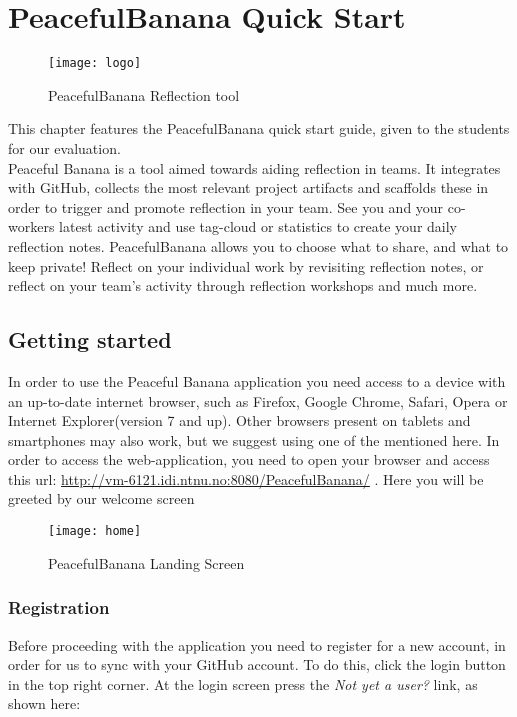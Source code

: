 \newpage
\thispagestyle{empty}
\mbox{}
\chapter{PeacefulBanana Quick Start}

\begin{figure}[h!]
\label{logo}
\centering
	\texttt{[image: logo]}
\caption{PeacefulBanana Reflection tool}
\end{figure}

This chapter features the PeacefulBanana quick start guide, given to the students for our evaluation. \\
Peaceful Banana is a tool aimed towards aiding reflection in teams. It integrates with GitHub, collects the most relevant project artifacts and scaffolds these in order to trigger and promote reflection in your team.
See you and your co-workers latest activity and use tag-cloud or statistics to create your daily reflection notes. PeacefulBanana allows you to choose what to share, and what to keep private! Reflect on your individual work by revisiting reflection notes, or reflect on your team's activity through reflection workshops and much more. 
\pagebreak

\section{Getting started}
In order to use the Peaceful Banana application you need access to a device with an up-to-date internet browser, such as Firefox, Google Chrome, Safari, Opera or Internet Explorer(version 7 and up). Other browsers present on tablets and smartphones may also work, but we suggest using one of the mentioned here. 
In order to access the web-application, you need to open your browser and access this url: \url{http://vm-6121.idi.ntnu.no:8080/PeacefulBanana/} . Here you will be greeted by our welcome screen\\

\begin{figure}[h!]
\label{homescreen}
\centering
	\texttt{[image: home]}
\caption{PeacefulBanana Landing Screen}
\end{figure}

\subsection{Registration}
Before proceeding with the application you need to register for a new account, in order for us to sync with your GitHub account. To do this, click the login button in the top right corner. At the login screen press the 
\textit{Not yet a user?} link, as shown here:

